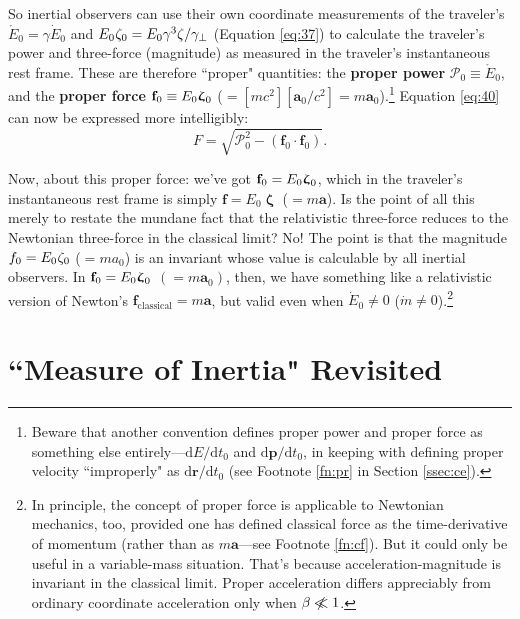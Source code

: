 \documentclass[12pt]{article}
\renewcommand{\vv}[1]{\mathbf{#1}}
\newcommand{\dd}[1]{\mathrm{d}#1}
\newcommand{\vvzeta}{\bm{\upzeta}}
\begin{document}
So inertial observers can use their own coordinate measurements of the traveler's $\mathring{E}_0 = \gamma \dot{E}_0$ and $E_0 \mkern.5mu \zeta_0 = E_0 \gamma^3 \zeta / \gamma_{\perp}$ (Equation \ref{eq:37}) to calculate the traveler's power and three-force (magnitude) as measured in the traveler's instantaneous rest frame. These are therefore ``proper" quantities: the \textbf{proper power} $\mathcal{P}_0 \equiv \mathring{E}_0$, and the \textbf{proper force} $\vv f_0 \equiv E_0 \vvzeta_{\mkern1mu 0}$ ($= [mc^2][\vv a_0 / c^2] = m \vv a_0$).\footnote{Beware that another convention defines proper power and proper force as something else entirely---$\dd E / \dd t_0$ and $\dd \vv p / \dd t_0$, in keeping with defining proper velocity ``improperly" as $\dd \vv r / \dd t_0$ (see Footnote \ref{fn:pr} in Section \ref{ssec:ce}).} Equation \ref{eq:40} can now be expressed more intelligibly:
\begin{equation}\label{eq:42}
F = \sqrt{\mathcal{P}_0^2 - (\vv f_0 \cdot \vv f_0)} .
\end{equation}

Now, about this proper force: we've got $\vv f_0 = E_0 \vvzeta_{\mkern1mu 0}$, which in the traveler's instantaneous rest frame is simply $\vv f = E_0 \vvzeta$ ($= m \vv a$). Is the point of all this merely to restate the mundane fact that the relativistic three-force reduces to the Newtonian three-force in the classical limit? No! The point is that the magnitude $f_0 = E_0 \mkern.5mu \zeta_0$ ($= m a_0$) is an invariant whose value is calculable by all inertial observers. In $\vv f_0 = E_0 \vvzeta_{\mkern1mu 0}$ $(= m \vv a_0)$, then, we have something like a relativistic version of Newton's $\vv f_{\mathrm{classical}} = m \vv a$, but valid even when $\dot{E}_0 \neq 0$ ($\dot{m} \neq 0$).\footnote{In principle, the concept of proper force is applicable to Newtonian mechanics, too, provided one has defined classical force as the time-derivative of momentum (rather than as $m \vv a$---see Footnote \ref{fn:cf}). But it could only be useful in a variable-mass situation. That's because acceleration-magnitude is invariant in the classical limit. Proper acceleration differs appreciably from ordinary coordinate acceleration only when $\beta \centernot{\ll} 1$.}


\section["Measure of Inertia" Revisited]{``Measure of Inertia" Revisited}\label{sec:in}
\end{document}
